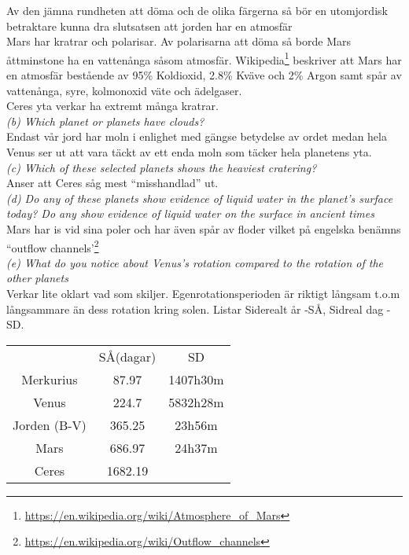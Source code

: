\documentclass[./exercises.tex]{subfiles}
\begin{document}
\begin{enumerate}
Av den jämna rundheten att döma och de olika färgerna så bör en utomjordisk betraktare
kunna dra slutsatsen att jorden har en atmosfär\\

Mars har kratrar och polarisar. Av polarisarna att döma så borde Mars åttminstone ha en vattenånga
såsom atmosfär. Wikipedia\footnote{\url{https://en.wikipedia.org/wiki/Atmosphere_of_Mars}} beskriver att
Mars har en atmosfär bestående av 95\% Koldioxid, 2.8\% Kväve och 2\% Argon samt spår av vattenånga, syre, kolmonoxid
väte och ädelgaser.\\

Ceres yta verkar ha extremt många kratrar.\\



\textit{(b) Which planet or planets have clouds?}\\

Endast vår jord har moln i enlighet med gängse betydelse av ordet medan hela Venus ser ut att vara täckt
av ett enda moln som täcker hela planetens yta.\\


\textit{(c) Which of these selected planets shows the heaviest cratering?}\\

Anser att Ceres såg mest ``misshandlad'' ut.\\

\textit{(d) Do any of these planets show evidence of liquid water in the planet’s surface today? Do any
show evidence of liquid water on the surface in ancient times}\\

Mars har is vid sina poler och har även spår av floder vilket på engelska benämns ``outflow channels'\footnote{\url{https://en.wikipedia.org/wiki/Outflow_channels}}\\


\textit{(e) What do you notice about Venus’s rotation compared to the rotation of the other planets}\\

Verkar lite oklart vad som skiljer. Egenrotationsperioden är riktigt långsam t.o.m långsammare än dess rotation
kring solen. Listar Siderealt år -SÅ, Sidreal dag -SD.
\begin{center}
\begin{tabular}{ |c|c|c| } 
 \hline
\hspace{1em}       &SÅ(dagar)   	& SD     	\\ 
 Merkurius         & 87.97 			& 1407h30m	\\ 
 Venus             & 224.7 			&5832h28m 	\\ 
 Jorden (B-V)	   & 365.25 		& 23h56m    \\ 
 Mars              &686.97			&24h37m		\\
 Ceres			   &1682.19			&           \\
 \hline
\end{tabular}
\end{center}



\end{enumerate}
\end{document}
